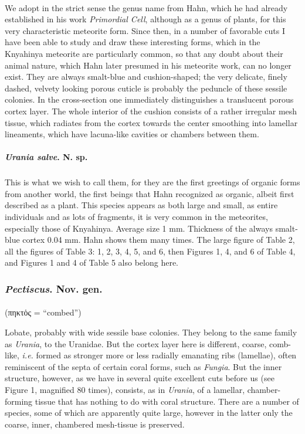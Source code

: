 \documentclass[a4paper, 12pt, oneside]{article}
\begin{document}
\paragraph*{}
We adopt in the strict sense the genus name from Hahn, which he had already established in his work \emph{Primordial Cell}, although as a genus of plants, for this very characteristic meteorite form. Since then, in a number of favorable cuts I have been able to study and draw these interesting forms, which in the Knyahinya meteorite are particularly common, so that any doubt about their animal nature, which Hahn later presumed in his meteorite work, can no longer exist. They are always smalt-blue and cushion-shaped; the very delicate, finely dashed, velvety looking porous cuticle is probably the peduncle of these sessile colonies. In the cross-section one immediately distinguishes a translucent porous cortex layer. The whole interior of the cushion consists of a rather irregular mesh tissue, which radiates from the cortex towards the center smoothing into lamellar lineaments, which have lacuna-like cavities or chambers between them.
\paragraph{\emph{Urania salve}. N. sp.}
\subparagraph{}
This is what we wish to call them, for they are the first greetings of organic forms from another world, the first beings that Hahn recognized as organic, albeit first described as a plant. This species appears as both large and small, as entire individuals and as lots of fragments, it is very common in the meteorites, especially those of Knyahinya. Average size 1 mm. Thickness of the always smalt-blue cortex 0.04 mm. Hahn shows them many times. The large figure of Table 2, all the figures of Table 3: 1, 2, 3, 4, 5, and 6, then Figures 1, 4, and 6 of Table 4, and Figures 1 and 4 of Table 5 also belong here.
\subsubsection{\emph{Pectiscus}. Nov. gen.}
\paragraph*{}
(πηκτὁς = ``combed'')%

Lobate, probably with wide sessile base colonies. They belong to the same family as \emph{Urania}, to the Uranidae. But the cortex layer here is different, coarse, comb-like, \emph{i.e.} formed as stronger more or less radially emanating ribs (lamellae), often reminiscent of the septa of certain coral forms, such as \emph{Fungia}. But the inner structure, however, as we have in several quite excellent cuts before us (see Figure 1, magnified 80 times), consists, as in \emph{Urania}, of a lamellar, chamber-forming tissue that has nothing to do with coral structure. There are a number of species, some of which are apparently quite large, however in the latter only the coarse, inner, chambered mesh-tissue is preserved.
\end{document}

